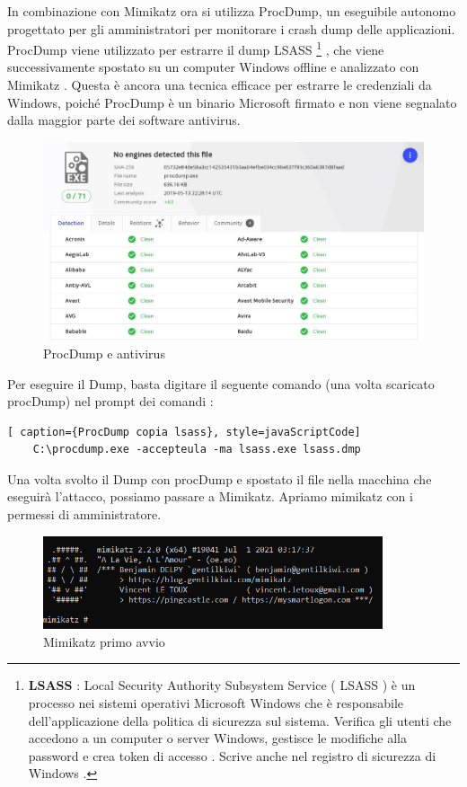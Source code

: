 In combinazione con Mimikatz ora si utilizza ProcDump\cite{ProcDump}, un eseguibile autonomo progettato per gli amministratori per monitorare i crash dump delle applicazioni. ProcDump viene utilizzato per estrarre il dump LSASS \footnote[1]{\textbf{LSASS} : Local Security Authority Subsystem Service ( LSASS ) è un processo nei sistemi operativi Microsoft Windows che è responsabile dell'applicazione della politica di sicurezza sul sistema. Verifica gli utenti che accedono a un computer o server Windows, gestisce le modifiche alla password e crea token di accesso . Scrive anche nel registro di sicurezza di Windows .} , che viene successivamente spostato su un computer Windows offline e analizzato con Mimikatz . Questa è ancora una tecnica efficace per estrarre le credenziali da Windows, poiché ProcDump è un binario Microsoft firmato e non viene segnalato dalla maggior parte dei software antivirus.

\begin{figure}[h!]
    \centering
    \includegraphics[width=120mm]{Immagini/2/procdump.jpg}
    \caption{ProcDump e antivirus}
    \label{fig:ProcDump}
\end{figure}

\newpage

Per eseguire il Dump, basta digitare il seguente comando (una volta scaricato procDump) nel prompt dei comandi :

\begin{lstlisting}[ caption={ProcDump copia lsass}, style=javaScriptCode]
    C:\procdump.exe -accepteula -ma lsass.exe lsass.dmp
\end{lstlisting}

Una volta svolto il Dump con procDump e spostato il file nella macchina che eseguirà l'attacco, possiamo passare a Mimikatz. 
Apriamo mimikatz con i permessi di amministratore.
\begin{figure}[h!]
    \centering
    \includegraphics[width=100mm]{Immagini/2/mimikatz_1.PNG}
    \caption{Mimikatz primo avvio}
    \label{fig:ProcDump}
\end{figure}

